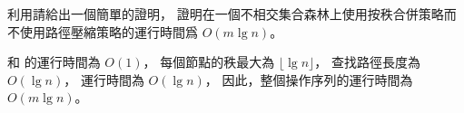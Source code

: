\startEXERCISE
利用\inexercise[19.4-2] 請給出一個簡單的證明，
證明在一個不相交集合森林上使用按秩合併策略而不使用路徑壓縮策略的運行時間爲 $O(m\lg n)$。
\stopEXERCISE

\startANSWER
{} 和  的運行時間為 $O(1)$，
每個節點的秩最大為 $\lfloor \lg n\rfloor$，
查找路徑長度為 $O(\lg n)$，
 運行時間為 $O(\lg n)$，
因此，整個操作序列的運行時間為 $O(m\lg n)$。
\stopANSWER